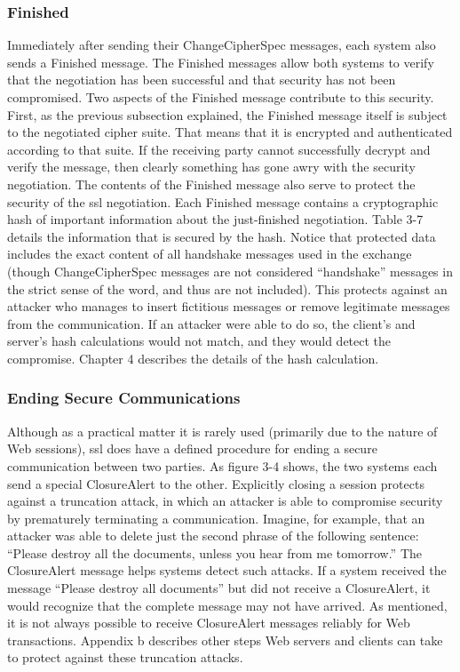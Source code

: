 \subsubsection{Finished}
Immediately after sending their ChangeCipherSpec messages, each
system also sends a Finished message. The Finished messages allow
both systems to verify that the negotiation has been successful and
that security has not been compromised. Two aspects of the Finished
message contribute to this security. First, as the previous subsection
explained, the Finished message itself is subject to the negotiated cipher suite. That means that it is encrypted and authenticated according to that suite. If the receiving party cannot successfully decrypt
and verify the message, then clearly something has gone awry with
the security negotiation.
The contents of the Finished message also serve to protect the security of the ssl negotiation. Each Finished message contains a cryptographic hash of important information about the just-finished
negotiation. Table 3-7 details the information that is secured by the
hash. Notice that protected data includes the exact content of all
handshake messages used in the exchange (though ChangeCipherSpec messages are not considered “handshake” messages in the strict
sense of the word, and thus are not included). This protects against
an attacker who manages to insert fictitious messages or remove legitimate messages from the communication. If an attacker were able
to do so, the client’s and server’s hash calculations would not match,
and they would detect the compromise. Chapter 4 describes the details of the hash calculation.

\subsubsection{Ending Secure Communications}
Although as a practical matter it is rarely used (primarily due to the
nature of Web sessions), ssl does have a defined procedure for ending a secure communication between two parties. As figure 3-4
shows, the two systems each send a special ClosureAlert to the other.
Explicitly closing a session protects against a truncation attack, in
which an attacker is able to compromise security by prematurely terminating a communication. Imagine, for example, that an attacker
was able to delete just the second phrase of the following sentence:
“Please destroy all the documents, unless you hear from me tomorrow.” The ClosureAlert message helps systems detect such attacks. If
a system received the message “Please destroy all documents” but did
not receive a ClosureAlert, it would recognize that the complete
message may not have arrived. As mentioned, it is not always possible to receive ClosureAlert messages reliably for Web transactions.
Appendix b describes other steps Web servers and clients can take to
protect against these truncation attacks.
